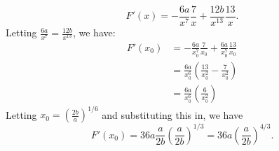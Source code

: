 \documentclass{article}
\begin{document}
\begin{enumerate}
\begin{enumerate}
\begin{equation}
            F'(x) = -\frac{6a}{x^7}\frac{7}{x}+\frac{12b}{x^{13}} \frac{13}{x}.
        \end{equation}
        Letting $\frac{6a}{x^7} = \frac{12b}{x^{13}}$, we have: 
        \begin{align*}
            F'(x_0) &= -\frac{6a}{x_0^7}\frac{7}{x_0}+\frac{6a}{x_0^7} \frac{13}{x_0} \\ 
            &= \frac{6a}{x_0^6}\left(\frac{13}{x_0^2}-\frac{7}{x_0^2}\right) \\ 
            &= \frac{6a}{x_0^6}\left(\frac{6}{x_0^2}\right)
        \end{align*}
        Letting $x_0=\left(\frac{2b}{a}\right)^{1/6}$ and substituting this in, we have
        \begin{equation}
            \boxed{F'(x_0) = 36a \frac{a}{2b}\left(\frac{a}{2b}\right)^{1/3}=36a\left(\frac{a}{2b}\right)^{4/3}.}
        \end{equation}
    \end{enumerate}
\end{enumerate}
\end{document}
